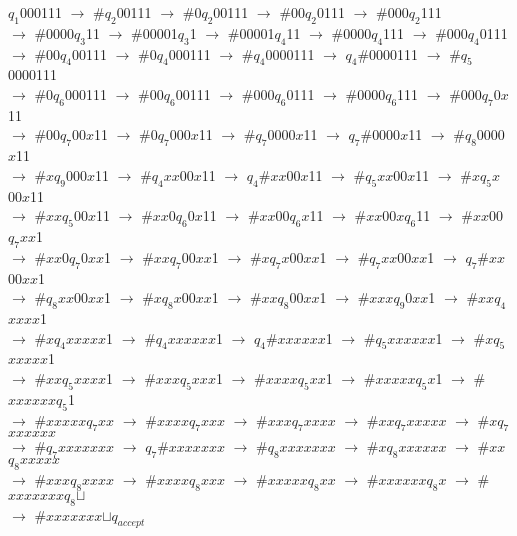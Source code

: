 \documentclass[12pt]{letter}
\begin{document}
\begin{enumerate}
\begin{enumerate}
\begin{enumerate}
$q_1$000111 $\rightarrow$ $\#$$q_2$00111 $\rightarrow$ $\#$0$q_2$00111 $\rightarrow$ $\#$00$q_2$0111 $\rightarrow$ $\#$000$q_2$111\\
		$\rightarrow$ $\#$0000$q_3$11 $\rightarrow$ $\#$00001$q_3$1 $\rightarrow$ $\#$00001$q_4$11 $\rightarrow$ $\#$0000$q_4$111 $\rightarrow$ $\#$000$q_4$0111 \\
		$\rightarrow$ $\#$00$q_4$00111 $\rightarrow$ $\#$0$q_4$000111 $\rightarrow$ $\#$$q_4$0000111 $\rightarrow$ $q_4$$\#$0000111 $\rightarrow$ $\#$$q_5$0000111 \\
		$\rightarrow$ $\#$0$q_6$000111 $\rightarrow$ $\#$00$q_6$00111 $\rightarrow$ $\#$000$q_6$0111 $\rightarrow$ $\#$0000$q_6$111 $\rightarrow$ $\#$000$q_7$0$x$11 \\
		$\rightarrow$ $\#$00$q_7$00$x$11 $\rightarrow$ $\#$0$q_7$000$x$11 $\rightarrow$ $\#$$q_7$0000$x$11 $\rightarrow$ $q_7$$\#$0000$x$11 $\rightarrow$ $\#$$q_8$0000$x$11 \\
		$\rightarrow$ $\#$$x$$q_9$000$x$11 $\rightarrow$ $\#$$q_4$$xx$00$x$11 $\rightarrow$ $q_4$$\#$$xx$00$x$11 $\rightarrow$ $\#$$q_5$$xx$00$x$11 $\rightarrow$ $\#$$x$$q_5$$x$00$x$11 \\
		$\rightarrow$ $\#$$xx$$q_5$00$x$11 $\rightarrow$ $\#$$xx$0$q_6$0$x$11 $\rightarrow$ $\#$$xx$00$q_6$$x$11 $\rightarrow$ $\#$$xx$00$x$$q_6$11 $\rightarrow$ $\#$$xx$00$q_7$$xx$1 \\
		$\rightarrow$ $\#$$xx$0$q_7$0$xx$1 $\rightarrow$ $\#$$xx$$q_7$00$xx$1 $\rightarrow$ $\#$$x$$q_7$$x$00$xx$1 $\rightarrow$ $\#$$q_7$$xx$00$xx$1 $\rightarrow$ $q_7$$\#$$xx$00$xx$1 \\
		$\rightarrow$ $\#$$q_8$$xx$00$xx$1 $\rightarrow$ $\#$$x$$q_8$$x$00$xx$1 $\rightarrow$ $\#$$xx$$q_8$00$xx$1 $\rightarrow$ $\#$$xxx$$q_9$0$xx$1 $\rightarrow$ $\#$$xx$$q_4$$xxxx$1 \\
		$\rightarrow$ $\#$$x$$q_4$$xxxxx$1 $\rightarrow$ $\#$$q_4$$xxxxxx$1 $\rightarrow$ $q_4$$\#$$xxxxxx$1 $\rightarrow$ $\#$$q_5$$xxxxxx$1 $\rightarrow$ $\#$$x$$q_5$$xxxxx$1 \\
		$\rightarrow$ $\#$$xx$$q_5$$xxxx$1 $\rightarrow$ $\#$$xxx$$q_5$$xxx$1 $\rightarrow$ $\#$$xxxx$$q_5$$xx$1 $\rightarrow$ $\#$$xxxxx$$q_5$$x$1 $\rightarrow$ $\#$$xxxxxx$$q_5$1 \\
		$\rightarrow$ $\#$$xxxxx$$q_7$$xx$ $\rightarrow$ $\#$$xxxx$$q_7$$xxx$ $\rightarrow$ $\#$$xxx$$q_7$$xxxx$ $\rightarrow$ $\#$$xx$$q_7$$xxxxx$ $\rightarrow$ $\#$$x$$q_7$$xxxxxx$ \\
		$\rightarrow$ $\#$$q_7$$xxxxxxx$ $\rightarrow$ $q_7$$\#$$xxxxxxx$ $\rightarrow$ $\#$$q_8$$xxxxxxx$ $\rightarrow$ $\#$$x$$q_8$$xxxxxx$ $\rightarrow$ $\#$$xx$$q_8$$xxxxx$ \\
		$\rightarrow$ $\#$$xxx$$q_8$$xxxx$ $\rightarrow$ $\#$$xxxx$$q_8$$xxx$ $\rightarrow$ $\#$$xxxxx$$q_8$$xx$ $\rightarrow$ $\#$$xxxxxx$$q_8$$x$ $\rightarrow$ $\#$$xxxxxxx$$q_8$$\sqcup$\\
		$\rightarrow$ $\#$$xxxxxxx$$\sqcup$$q_{accept}$\\


\end{enumerate}
\end{enumerate}
\end{enumerate}
\end{document}
